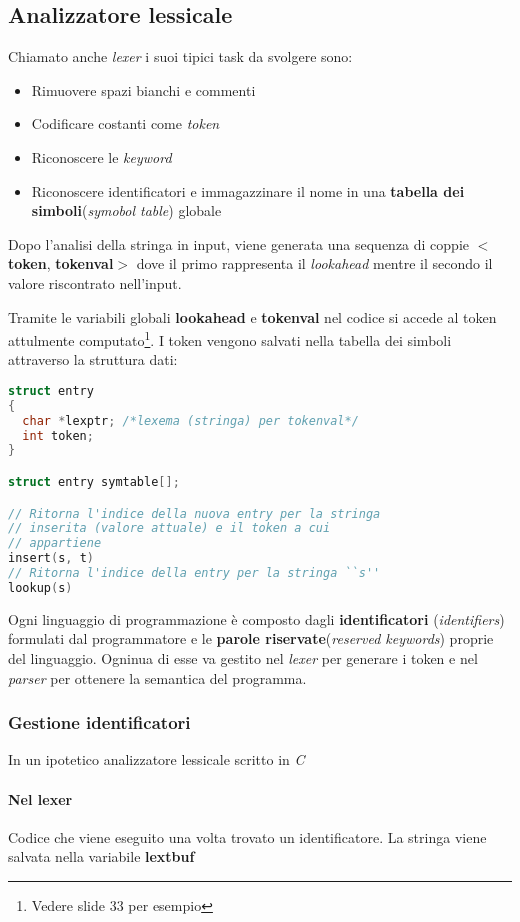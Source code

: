 \subsection{Analizzatore lessicale}
\label{sec:analizzatore_lessicale}
Chiamato anche \textit{lexer} i suoi tipici task da svolgere sono:
\begin{itemize}
\item Rimuovere spazi bianchi e commenti
\item Codificare costanti come \textit{token}
\item Riconoscere le \textit{keyword}
\item Riconoscere identificatori e immagazzinare il nome in una
\textbf{tabella dei simboli}(\textit{symobol table}) globale
\end{itemize}

Dopo l'analisi della stringa in input, viene generata una sequenza di coppie
$<$\textbf{token}, \textbf{tokenval}$>$ dove il primo rappresenta il
\textit{lookahead} mentre il secondo il valore riscontrato nell'input.

Tramite le variabili globali \textbf{lookahead} e \textbf{tokenval} nel codice
si accede al token attulmente computato\footnote{Vedere slide 33 per esempio}.
I token vengono salvati nella tabella dei simboli attraverso la struttura dati:

\begin{lstlisting}[language=C]
struct entry
{
  char *lexptr; /*lexema (stringa) per tokenval*/
  int token;
}

struct entry symtable[];

// Ritorna l'indice della nuova entry per la stringa
// inserita (valore attuale) e il token a cui
// appartiene
insert(s, t)
// Ritorna l'indice della entry per la stringa ``s''
lookup(s)
\end{lstlisting}

Ogni linguaggio di programmazione è composto dagli \textbf{identificatori}
(\textit{identifiers}) formulati dal programmatore e le
\textbf{parole riservate}(\textit{reserved keywords}) proprie del linguaggio.
Ogninua di esse va gestito nel \textit{lexer} per generare i token e nel
\textit{parser} per ottenere la semantica del programma.

\subsubsection{Gestione identificatori}
In un ipotetico analizzatore lessicale scritto in \textit{C}
\paragraph{Nel lexer}
Codice che viene eseguito una volta trovato un identificatore. La stringa viene
salvata nella variabile \textbf{lextbuf}

